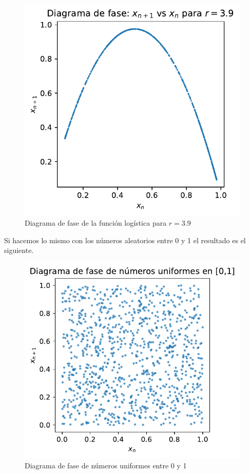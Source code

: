 \documentclass[
  10pt,
  a4paper,
  DIV=11,
  numbers=noendperiod,
  open=any]{scrreprt}
\numberwithin{equation}{chapter}
\numberwithin{equation}{section}
\renewcommand{\[}{\begin{equation}}
\renewcommand{\]}{\end{equation}}
\begin{document}
\begin{figure}[h]
  \centering
  \includegraphics[width=0.99\textwidth]{04-clima/atractor_files/figure-pdf/cell-4-output-1.pdf}
  \caption{Diagrama de fase de la función logística para $r=3.9$}
\end{figure}


Si hacemos lo mismo con los números aleatorios entre 0 y 1 el resultado
es el siguiente.

\begin{figure}[h]
  \centering
  \includegraphics[width=0.99\textwidth]{04-clima/atractor_files/figure-pdf/cell-5-output-1.pdf}
  \caption{Diagrama de fase de números uniformes entre 0 y 1}
\end{figure}
\end{document}
